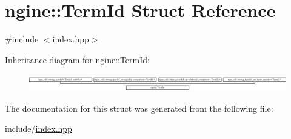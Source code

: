 \hypertarget{structngine_1_1TermId}{}\section{ngine\+:\+:Term\+Id Struct Reference}
\label{structngine_1_1TermId}


{\ttfamily \#include $<$index.\+hpp$>$}

Inheritance diagram for ngine\+:\+:Term\+Id\+:\begin{figure}[H]
\begin{center}
\leavevmode
\includegraphics[height=0.740741cm]{structngine_1_1TermId}
\end{center}
\end{figure}


The documentation for this struct was generated from the following file\+:\begin{DoxyCompactItemize}
\item 
include/\hyperlink{index_8hpp}{index.\+hpp}\end{DoxyCompactItemize}
